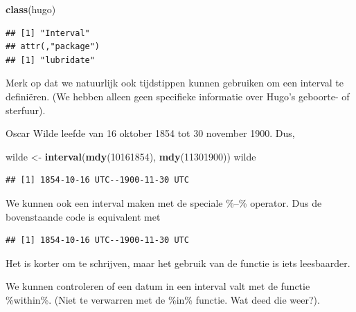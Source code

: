 \documentclass[]{tufte-book}
\newenvironment{Shaded}{}{}
\newcommand{\DecValTok}[1]{\textcolor[rgb]{0.25,0.63,0.44}{#1}}
\newcommand{\KeywordTok}[1]{\textcolor[rgb]{0.00,0.44,0.13}{\textbf{#1}}}
\newcommand{\NormalTok}[1]{#1}
\newcommand{\OperatorTok}[1]{\textcolor[rgb]{0.40,0.40,0.40}{#1}}
\newcommand{\StringTok}[1]{\textcolor[rgb]{0.25,0.44,0.63}{#1}}
\begin{document}
\begin{Shaded}
\begin{Highlighting}[]
\KeywordTok{class}\NormalTok{(hugo)}
\end{Highlighting}
\end{Shaded}

\begin{verbatim}
## [1] "Interval"
## attr(,"package")
## [1] "lubridate"
\end{verbatim}

Merk op dat we natuurlijk ook tijdstippen kunnen gebruiken om een interval te definiëren. (We hebben alleen geen specifieke informatie over Hugo's geboorte- of sterfuur).

Oscar Wilde leefde van 16 oktober 1854 tot 30 november 1900. Dus,

\begin{Shaded}
\begin{Highlighting}[]
\NormalTok{wilde <-}\StringTok{ }\KeywordTok{interval}\NormalTok{(}\KeywordTok{mdy}\NormalTok{(}\DecValTok{10161854}\NormalTok{), }\KeywordTok{mdy}\NormalTok{(}\DecValTok{11301900}\NormalTok{))}
\NormalTok{wilde}
\end{Highlighting}
\end{Shaded}

\begin{verbatim}
## [1] 1854-10-16 UTC--1900-11-30 UTC
\end{verbatim}

We kunnen ook een interval maken met de speciale \%--\% operator. Dus de bovenstaande code is equivalent met

\begin{Shaded}
\end{Shaded}

\begin{verbatim}
## [1] 1854-10-16 UTC--1900-11-30 UTC
\end{verbatim}

Het is korter om te schrijven, maar het gebruik van de functie is iets leesbaarder.

We kunnen controleren of een datum in een interval valt met de functie \%within\%. (Niet te verwarren met de \%in\% functie. Wat deed die weer?).
\end{document}
